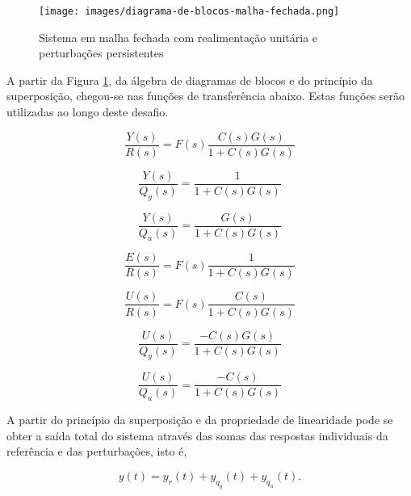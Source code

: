 \begin{figure}[htp]
	\centering
    \captionsetup{justification=centering}
	\caption{Sistema em malha fechada com realimentação unitária e perturbações
    persistentes}
	\label{fig:diagrama-de-blocos-malha-fechada}
	\texttt{[image: images/diagrama-de-blocos-malha-fechada.png]}
\end{figure}

A partir da Figura \ref{fig:diagrama-de-blocos-malha-fechada}, da álgebra de
diagramas de blocos e do princípio da superposição, chegou-se nas funções de
transferência abaixo. Estas funções serão utilizadas ao longo deste desafio.

\begin{equation}
    \label{eq:y2r-tf}
    \frac{Y(s)}{R(s)} = F(s)\frac{C(s)G(s)}{1 + C(s)G(s)}
\end{equation}

\begin{equation}
    \label{eq:y2qy-tf}
    \frac{Y(s)}{Q_{y}(s)} = \frac{1}{1 + C(s)G(s)}
\end{equation}

\begin{equation}
    \label{eq:y2qu-tf}
    \frac{Y(s)}{Q_{u}(s)} = \frac{G(s)}{1 + C(s)G(s)}
\end{equation}

\begin{equation}
    \label{eq:e2r-tf}
    \frac{E(s)}{R(s)} = F(s)\frac{1}{1 + C(s)G(s)}
\end{equation}

\begin{equation}
    \label{eq:u2r-tf}
    \frac{U(s)}{R(s)} = F(s)\frac{C(s)}{1 + C(s)G(s)}
\end{equation}

\begin{equation}
    \label{eq:u2qy-tf}
    \frac{U(s)}{Q_{y}(s)} = \frac{-C(s)G(s)}{1 + C(s)G(s)}
\end{equation}

\begin{equation}
    \label{eq:u2qu-tf}
    \frac{U(s)}{Q_{u}(s)} = \frac{-C(s)}{1 + C(s)G(s)}
\end{equation}

A partir do princípio da superposição e da propriedade de linearidade pode se
obter a saída total do sistema através das somas das respostas individuais da
referência e das perturbações, isto é,

\begin{equation}
    \label{eq:saida-do-sistema}
    y(t) = y_{r}(t) + y_{q_{y}}(t) + y_{q_{u}}(t).
\end{equation}

